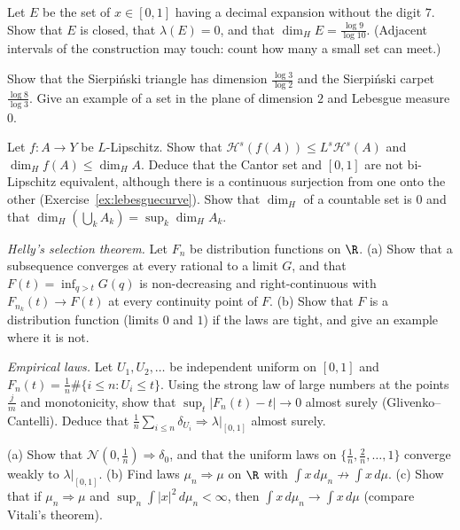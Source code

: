 \begin{exercise}[$\star$]\label{ex:nodigit7}
Let $E$ be the set of $x\in[0,1]$ having a decimal expansion without the digit $7$. Show that $E$ is closed, that $\lambda(E)=0$, and that $\dim_HE=\frac{\log9}{\log10}$. (Adjacent intervals of the construction may touch: count how many a
small set can meet.)
\end{exercise}

\begin{exercise}[$\star\star$]\label{ex:carpet}
Show that the Sierpi\'nski triangle has dimension $\frac{\log3}{\log2}$ and the Sierpi\'nski carpet $\frac{\log8}{\log3}$. Give an example of a set in the plane of dimension $2$ and Lebesgue measure $0$.
\end{exercise}

\begin{exercise}[$\star$]\label{ex:lipschitzdim}
Let $f:A\to Y$ be $L$-Lipschitz. Show that $\mathcal H^s(f(A))\le L^s\mathcal H^s(A)$ and $\dim_Hf(A)\le\dim_HA$. Deduce that the Cantor set and $[0,1]$ are not bi-Lipschitz equivalent, although there is a continuous surjection from
one onto the other (Exercise~\ref{ex:lebesguecurve}). Show that $\dim_H$ of a countable set is $0$ and that $\dim_H(\bigcup_kA_k)=\sup_k\dim_HA_k$.
\end{exercise}

\begin{exercise}[$\star\star$]\label{ex:helly}
\emph{Helly's selection theorem.} Let $F_n$ be distribution functions on $\R$. (a) Show that a subsequence converges at every rational to a limit $G$, and that $F(t)=\inf_{q>t}G(q)$ is non-decreasing and right-continuous
with $F_{n_k}(t)\to F(t)$ at every continuity point of $F$. (b) Show that $F$ is a distribution function (limits $0$ and $1$) if the laws are tight, and give an example where it is not.
\end{exercise}

\begin{exercise}[$\star\star$]\label{ex:glivenko}
\emph{Empirical laws.} Let $U_1,U_2,\ldots$ be independent uniform on $[0,1]$ and $F_n(t)=\frac1n\#\{i\le n:U_i\le t\}$. Using the strong law of large numbers at the points $\frac jm$ and monotonicity, show that
$\sup_t|F_n(t)-t|\to0$ almost surely (Glivenko--Cantelli). Deduce that $\frac1n\sum_{i\le n}\delta_{U_i}\Rightarrow\lambda|_{[0,1]}$ almost surely.
\end{exercise}

\begin{exercise}[$\star\star$]\label{ex:weakexamples}
(a) Show that $\mathcal N(0,\frac1n)\Rightarrow\delta_0$, and that the uniform laws on $\{\frac1n,\frac2n,\dots,1\}$ converge weakly to $\lambda|_{[0,1]}$. (b) Find laws $\mu_n\Rightarrow\mu$ on $\R$ with $\int x\,d\mu_n\not\to\int x\,d\mu$. (c) Show that
if $\mu_n\Rightarrow\mu$ and $\sup_n\int|x|^2\,d\mu_n<\infty$, then $\int x\,d\mu_n\to\int x\,d\mu$ (compare Vitali's theorem).
\end{exercise}


